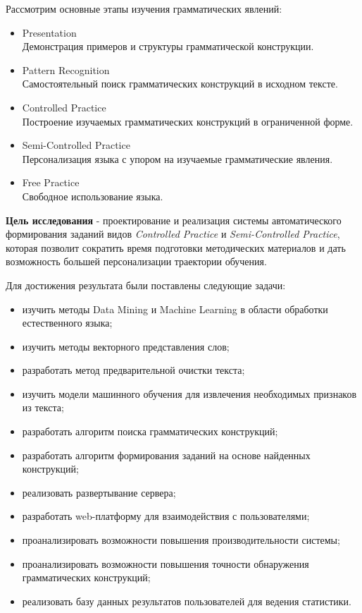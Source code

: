 Рассмотрим основные этапы изучения грамматических явлений:

\begin{itemize}
  \item Presentation \\ Демонстрация примеров и структуры грамматической конструкции.
  \item Pattern Recognition\\Самостоятельный поиск грамматических конструкций в исходном тексте.
 \item Controlled Practice\\Построение изучаемых грамматических конструкций в ограниченной форме.
 \item Semi-Controlled Practice\\Персонализация языка с упором на изучаемые грамматические явления.
 \item Free Practice\\Свободное использование языка.
\end{itemize}

\textbf{Цель исследования} - проектирование и реализация системы автоматического формирования заданий видов \emph{Controlled Practice} и \emph{Semi-Controlled Practice}, которая позволит сократить время подготовки методических материалов и дать возможность большей персонализации траектории обучения.

Для достижения результата были поставлены следующие задачи:

\begin{itemize}
  \item изучить методы Data Mining и Machine Learning в области обработки естественного языка; 
  \item изучить методы векторного представления слов;
  \item разработать метод предварительной очистки текста;
  \item изучить модели машинного обучения для извлечения необходимых признаков из текста;
  \item разработать алгоритм поиска грамматических конструкций;
  \item разработать алгоритм формирования заданий на основе найденных конструкций;
  \item реализовать развертывание сервера;
  \item разработать web-платформу для взаимодействия с пользователями;
  \item проанализировать возможности повышения производительности системы;
  \item проанализировать возможности повышения точности обнаружения грамматических конструкций;
  \item реализовать базу данных результатов пользователей для ведения статистики.
\end{itemize}

